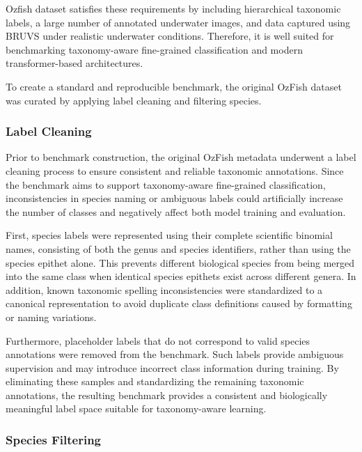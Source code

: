 \documentclass[preprint,12pt]{elsarticle}
\begin{document}
Ozfish dataset satisfies these requirements by including hierarchical
taxonomic labels, a large number of annotated underwater images, and
data captured using BRUVS under realistic underwater conditions.
Therefore, it is well suited for benchmarking taxonomy-aware
fine-grained classification and modern transformer-based architectures.

To create a standard and reproducible benchmark, the original OzFish
dataset was curated by applying label cleaning and filtering species.

\subsubsection{\texorpdfstring{Label Cleaning
}{Label Cleaning }}\label{label-cleaning}

Prior to benchmark construction, the original OzFish metadata underwent
a label cleaning process to ensure consistent and reliable taxonomic
annotations. Since the benchmark aims to support taxonomy-aware
fine-grained classification, inconsistencies in species naming or
ambiguous labels could artificially increase the number of classes and
negatively affect both model training and evaluation.

First, species labels were represented using their complete scientific
binomial names, consisting of both the genus and species identifiers,
rather than using the species epithet alone. This prevents different
biological species from being merged into the same class when identical
species epithets exist across different genera. In addition, known
taxonomic spelling inconsistencies were standardized to a canonical
representation to avoid duplicate class definitions caused by formatting
or naming variations.

Furthermore, placeholder labels that do not correspond to valid species
annotations were removed from the benchmark. Such labels provide
ambiguous supervision and may introduce incorrect class information
during training. By eliminating these samples and standardizing the
remaining taxonomic annotations, the resulting benchmark provides a
consistent and biologically meaningful label space suitable for
taxonomy-aware learning.

\subsubsection{\texorpdfstring{Species Filtering
}{Species Filtering }}\label{species-filtering}
\end{document}
